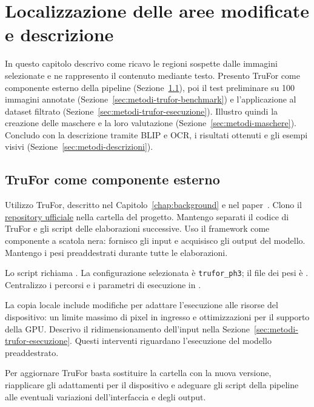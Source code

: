 
\chapter{Localizzazione delle aree modificate e descrizione}
\label{chap:localizzazione-descrizione}

In questo capitolo descrivo come ricavo le regioni sospette dalle immagini selezionate e ne rappresento il contenuto mediante testo. Presento TruFor come componente esterno della pipeline (Sezione~\ref{sec:materiali-trufor}), poi il test preliminare su 100 immagini annotate (Sezione~\ref{sec:metodi-trufor-benchmark}) e l'applicazione al dataset filtrato (Sezione~\ref{sec:metodi-trufor-esecuzione}). Illustro quindi la creazione delle maschere e la loro valutazione (Sezione~\ref{sec:metodi-maschere}). Concludo con la descrizione tramite BLIP e OCR, i risultati ottenuti e gli esempi visivi (Sezione~\ref{sec:metodi-descrizioni}).

\section{TruFor come componente esterno}
\label{sec:materiali-trufor}

Utilizzo TruFor, descritto nel Capitolo~\ref{chap:background} e nel paper~\cite{Guillaro_2023_CVPR}. Clono il \href{https://github.com/grip-unina/TruFor}{repository ufficiale} nella cartella  del progetto. Mantengo separati il codice di TruFor e gli script delle elaborazioni successive. Uso il framework come componente a scatola nera: fornisco gli input e acquisisco gli output del modello. Mantengo i pesi preaddestrati durante tutte le elaborazioni.

Lo script  richiama . La configurazione selezionata è \texttt{trufor\_ph3}; il file dei pesi è . Centralizzo i percorsi e i parametri di esecuzione in .

La copia locale include modifiche per adattare l’esecuzione alle risorse del dispositivo: un limite massimo di pixel in ingresso e ottimizzazioni per il supporto della GPU. Descrivo il ridimensionamento dell'input nella Sezione~\ref{sec:metodi-trufor-esecuzione}. Questi interventi riguardano l'esecuzione del modello preaddestrato. 

Per aggiornare TruFor basta sostituire la cartella  con la nuova versione, riapplicare gli adattamenti per il dispositivo e adeguare gli script della pipeline alle eventuali variazioni dell’interfaccia e degli output.

